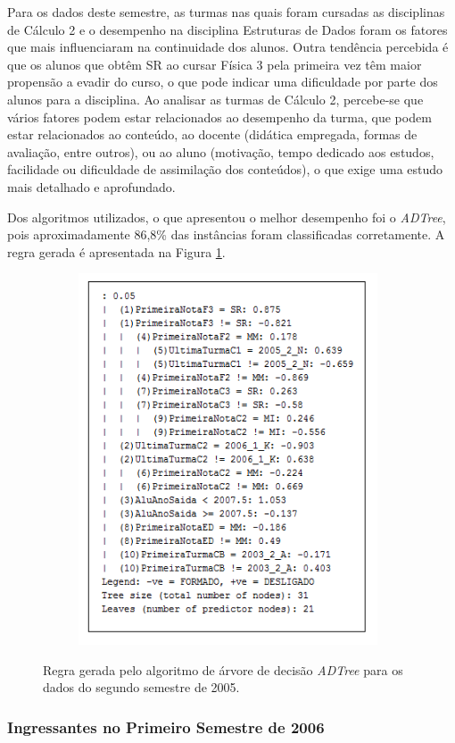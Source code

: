 Para os dados deste semestre, as turmas nas quais foram cursadas as disciplinas de Cálculo 2 e o desempenho na disciplina Estruturas de Dados foram os fatores que mais influenciaram na continuidade dos alunos. Outra tendência percebida é que os alunos que obtêm SR ao cursar Física 3 pela primeira vez têm maior propensão a evadir do curso, o que pode indicar uma dificuldade por parte dos alunos para a disciplina. Ao analisar as turmas de Cálculo 2, percebe-se que vários fatores podem estar relacionados ao desempenho da turma, que podem estar relacionados ao conteúdo, ao docente (didática empregada, formas de avaliação, entre outros), ou ao aluno (motivação, tempo dedicado aos estudos, facilidade ou dificuldade de assimilação dos conteúdos), o que exige uma estudo mais detalhado e aprofundado.

Dos algoritmos utilizados, o que apresentou o melhor desempenho foi o \textit{ADTree}, pois aproximadamente 86,8\% das instâncias foram classificadas corretamente. A regra gerada é apresentada na Figura \ref{regra2_2005}. 

 \begin{figure}[!h]
 	\centering
 	{\includegraphics[width=11cm, height=11cm]{images/regra2_2005}}
 	\caption {Regra gerada pelo algoritmo de árvore de decisão \textit{ADTree} para os dados do segundo semestre de 2005.}
 	\label{regra2_2005}
 \end{figure}


\subsubsection{Ingressantes no Primeiro Semestre de 2006}

